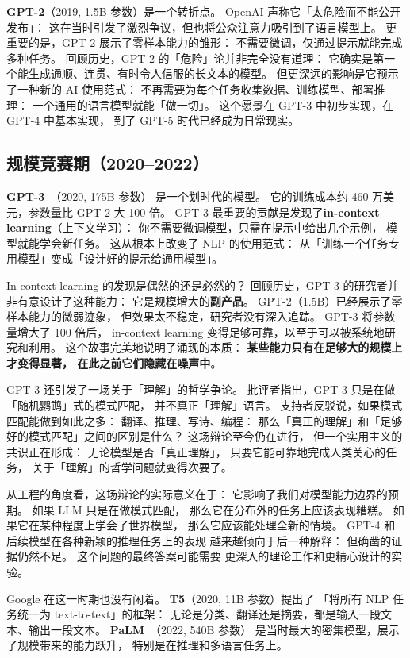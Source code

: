 \textbf{GPT-2}（2019, 1.5B 参数）是一个转折点。
OpenAI 声称它「太危险而不能公开发布」：
这在当时引发了激烈争议，但也将公众注意力吸引到了语言模型上。
更重要的是，GPT-2 展示了零样本能力的雏形：
不需要微调，仅通过提示就能完成多种任务。
回顾历史，GPT-2 的「危险」论并非完全没有道理：
它确实是第一个能生成通顺、连贯、有时令人信服的长文本的模型。
但更深远的影响是它预示了一种新的 AI 使用范式：
不再需要为每个任务收集数据、训练模型、部署推理：
一个通用的语言模型就能「做一切」。
这个愿景在 GPT-3 中初步实现，在 GPT-4 中基本实现，
到了 GPT-5 时代已经成为日常现实。

\subsection{规模竞赛期（2020--2022）}

\textbf{GPT-3}~\cite{brown2020gpt3}（2020, 175B 参数）
是一个划时代的模型。
它的训练成本约 460 万美元，参数量比 GPT-2 大 100 倍。
GPT-3 最重要的贡献是发现了\textbf{in-context learning}（上下文学习）：
你不需要微调模型，只需在提示中给出几个示例，
模型就能学会新任务。
这从根本上改变了 NLP 的使用范式：
从「训练一个任务专用模型」变成「设计好的提示给通用模型」。

In-context learning 的发现是偶然的还是必然的？
回顾历史，GPT-3 的研究者并非有意设计了这种能力：
它是规模增大的\textbf{副产品}。
GPT-2（1.5B）已经展示了零样本能力的微弱迹象，
但效果太不稳定，研究者没有深入追踪。
GPT-3 将参数量增大了 100 倍后，
in-context learning 变得足够可靠，以至于可以被系统地研究和利用。
这个故事完美地说明了涌现的本质：
\textbf{某些能力只有在足够大的规模上才变得显著，
在此之前它们隐藏在噪声中}。

GPT-3 还引发了一场关于「理解」的哲学争论。
批评者指出，GPT-3 只是在做「随机鹦鹉」式的模式匹配，
并不真正「理解」语言。
支持者反驳说，如果模式匹配能做到如此之多：
翻译、推理、写诗、编程：
那么「真正的理解」和「足够好的模式匹配」之间的区别是什么？
这场辩论至今仍在进行，
但一个实用主义的共识正在形成：
无论模型是否「真正理解」，
只要它能可靠地完成人类关心的任务，
关于「理解」的哲学问题就变得次要了。

从工程的角度看，这场辩论的实际意义在于：
它影响了我们对模型能力边界的预期。
如果 LLM 只是在做模式匹配，
那么它在分布外的任务上应该表现糟糕。
如果它在某种程度上学会了世界模型，
那么它应该能处理全新的情境。
GPT-4 和后续模型在各种新颖的推理任务上的表现
越来越倾向于后一种解释：
但确凿的证据仍然不足。
这个问题的最终答案可能需要
更深入的理论工作和更精心设计的实验。

Google 在这一时期也没有闲着。
\textbf{T5}（2020, 11B 参数）提出了
「将所有 NLP 任务统一为 text-to-text」的框架：
无论是分类、翻译还是摘要，都是输入一段文本、输出一段文本。
\textbf{PaLM}~\cite{chowdhery2022palm}（2022, 540B 参数）
是当时最大的密集模型，展示了规模带来的能力跃升，
特别是在推理和多语言任务上。

